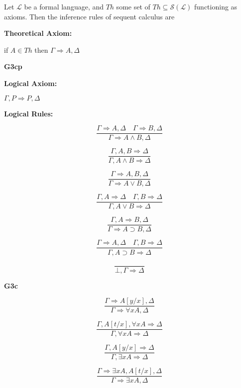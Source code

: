 \begin{definition}\label{def:Seq-Calc}
  \leanok
    Let $\mathcal{L}$ be a formal language, and $Th$ some set of $Th \subseteq \mathcal{S}(\mathcal{L})$ functioning as axioms. Then the inference rules of sequent calculus are

\noindent \textbf{Theoretical Axiom:}

if $A \in Th$ then $\Gamma \Rightarrow A, \Delta$

\begin{center}
    \textbf{G3cp}
\end{center}
\noindent \textbf{Logical Axiom:}

$\Gamma, P \Rightarrow P, \Delta$

\noindent \textbf{Logical Rules:}
\begin{multicols}{2}
\[
\frac{\Gamma \Rightarrow A, \Delta \quad \Gamma \Rightarrow B, \Delta}{\Gamma \Rightarrow A \land B, \Delta}\tag{$R\land$}
\]

\[
\frac{\Gamma, A, B \Rightarrow \Delta}{\Gamma, A \land B \Rightarrow \Delta}\tag{$L\land$}
\]

\[
\frac{\Gamma \Rightarrow A, B, \Delta}{\Gamma \Rightarrow A \lor B, \Delta}\tag{$R\lor$}
\]

\[
\frac{\Gamma, A \Rightarrow \Delta \quad \Gamma, B \Rightarrow \Delta}{\Gamma, A \lor B \Rightarrow \Delta}\tag{$L\lor$}
\]

\[
\frac{\Gamma, A \Rightarrow B, \Delta}{\Gamma \Rightarrow A \supset B, \Delta}\tag{$R\supset$}
\]

\[
\frac{\Gamma \Rightarrow A, \Delta \quad \Gamma, B \Rightarrow \Delta}{\Gamma, A \supset B \Rightarrow \Delta}\tag{$L\supset$}
\]

\[
\frac{}{\bot, \Gamma \Rightarrow \Delta}\tag{$L\bot$}
\]

\end{multicols}

\begin{center}
    \textbf{G3c}
\end{center}
\begin{multicols}{2}

\[
\frac{\Gamma \Rightarrow A[y/x], \Delta}{\Gamma \Rightarrow \forall x A, \Delta}\tag{$R\forall$}
\]

\[
\frac{\Gamma, A[t/x], \forall x A \Rightarrow \Delta}{\Gamma, \forall x A \Rightarrow \Delta}\tag{$L\forall$}
\]

\[
\frac{\Gamma, A[y/x] \Rightarrow \Delta}{\Gamma, \exists x A \Rightarrow \Delta}\tag{$L\exists$}
\]

\[
\frac{\Gamma \Rightarrow \exists x A, A[t/x], \Delta}{\Gamma \Rightarrow \exists x A, \Delta}\tag{$R\exists$}
\]

\end{multicols}

\end{definition}


